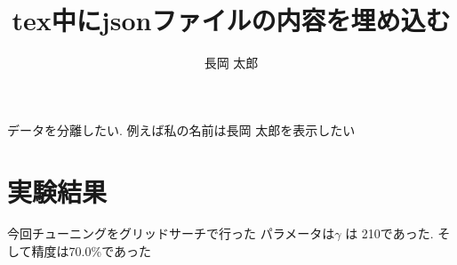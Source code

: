 \documentclass[uplatex]{jsarticle}
\begin{document}
\title{tex中にjsonファイルの内容を埋め込む}
\author{
長岡 太郎
}
\maketitle

データを分離したい.
例えば私の名前は長岡 太郎を表示したい

\section{実験結果}
今回チューニングをグリッドサーチで行った
パラメータは$\gamma$ は 210であった.
そして精度は70.0\%であった
\end{document}
